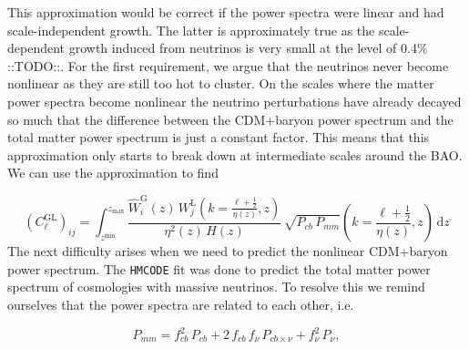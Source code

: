 \documentclass[oneside]{book}
\newcommand*{\rd}{\mathrm{d}}
\newcommand*{\marktodo}{{\color{mmcol} ::TODO::}\xspace}
\begin{document}
This approximation would be correct if the power spectra were linear and had scale-independent growth. The latter is approximately true as the scale-dependent growth induced from neutrinos is very small at the level of 0.4\% \marktodo. For the first requirement, we argue that the neutrinos never become nonlinear as they are still too hot to cluster.  On the scales where the matter power spectra become nonlinear the neutrino perturbations have already decayed so much that the difference between the CDM+baryon power spectrum and the total matter power spectrum is just a constant factor. This means that this approximation only starts to break down at intermediate scales around the BAO. We can use the approximation to find 

\begin{equation}
    \left(C^\mathrm{GL}_{\ell}\right)_{ij} = \int_{z^\mathrm{min}}^{z_\mathrm{max}} \frac{\hat{W}^\mathrm{G}_i(z)\,W^\mathrm{L}_j\left(k=\frac{\ell+\frac{1}{2}}{\eta(z)},z\right)}{\eta^2(z)\,H(z)}\,\sqrt{P_{cb}\,P_{mm}}\left(k=\frac{\ell+\frac{1}{2}}{\eta(z)},z\right)\,\rd z
\end{equation}
The next difficulty arises when we need to predict the nonlinear CDM+baryon power spectrum. The {\tt HMCODE} fit was done to predict the total matter power spectrum of cosmologies with massive neutrinos. To resolve this we remind ourselves that the power spectra are related to each other, i.e. 

\begin{equation}
    P_{mm} = f_{cb}^2\,P_{cb}+2\,f_{cb}\,f_\nu\,P_{cb\times\nu}+f_{\nu}^2\,P_{\nu},
\end{equation} 
\end{document}
